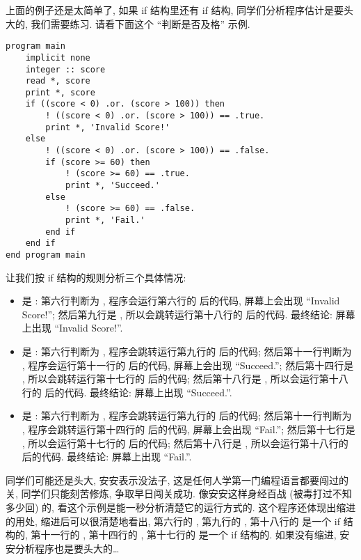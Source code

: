 上面的例子还是太简单了, 如果 if 结构里还有 if 结构, 同学们分析程序估计是要头大的, 我们需要练习. 请看下面这个 ``判断是否及格'' 示例. \label{whether_passed}
\begin{lstlisting}
program main
    implicit none
    integer :: score
    read *, score
    print *, score
    if ((score < 0) .or. (score > 100)) then
        ! ((score < 0) .or. (score > 100)) == .true.
        print *, 'Invalid Score!'
    else
        ! ((score < 0) .or. (score > 100)) == .false.
        if (score >= 60) then
            ! (score >= 60) == .true.
            print *, 'Succeed.'
        else
            ! (score >= 60) == .false.
            print *, 'Fail.'
        end if
    end if
end program main
\end{lstlisting}
让我们按 if 结构的规则分析三个具体情况:
\begin{itemize}
    \item {} 是 : 第六行判断为 , 程序会运行第六行的  后的代码, 屏幕上会出现 ``Invalid Score!''; 然后第九行是 , 所以会跳转运行第十八行的  后的代码. 最终结论: 屏幕上出现 ``Invalid Score!''.
    \item {} 是 : 第六行判断为 , 程序会跳转运行第九行的  后的代码; 然后第十一行判断为 , 程序会运行第十一行的  后的代码, 屏幕上会出现 ``Succeed.''; 然后第十四行是 , 所以会跳转运行第十七行的  后的代码; 然后第十八行是 , 所以会运行第十八行的  后的代码. 最终结论: 屏幕上出现 ``Succeed.''.
    \item {} 是 : 第六行判断为 , 程序会跳转运行第九行的  后的代码; 然后第十一行判断为 , 程序会跳转运行第十四行的  后的代码, 屏幕上会出现 ``Fail.''; 然后第十七行是 , 所以会运行第十七行的  后的代码; 然后第十八行是 , 所以会运行第十八行的  后的代码. 最终结论: 屏幕上出现 ``Fail.''.
\end{itemize}
同学们可能还是头大, 安安表示没法子, 这是任何人学第一门编程语言都要闯过的关, 同学们只能刻苦修炼, 争取早日闯关成功. 像安安这样身经百战 (被毒打过不知多少回) 的, 看这个示例是能一秒分析清楚它的运行方式的. 这个程序还体现出缩进的用处, 缩进后可以很清楚地看出, 第六行的 , 第九行的 , 第十八行的  是一个 if 结构的, 第十一行的 , 第十四行的 , 第十七行的  是一个 if 结构的. 如果没有缩进, 安安分析程序也是要头大的\dots{}


